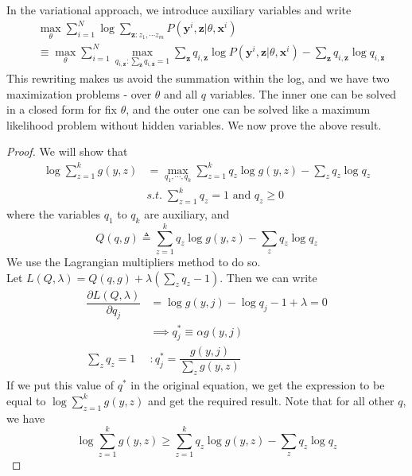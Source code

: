 In the variational approach, we introduce auxiliary variables and write
\begin{equation}
\begin{split}
&\max_\theta \sum_{i=1}^N \log \sum_{\mathbf z:z_1, \cdots z_m}P(\mathbf y^i, \mathbf z | \theta, \mathbf x^i) \\
&\equiv \max_\theta\sum_{i=1}^N \max_{q_{i,\mathbf z}:\sum_{\mathbf z} q_{i, \mathbf z} = 1} \sum_{\mathbf z} q_{i, \mathbf z} \log P(\mathbf y^i, \mathbf z | \theta, \mathbf x^i) - \sum_{\mathbf z} q_{i, \mathbf z} \log q_{i, \mathbf z}
\end{split}
\end{equation}
This rewriting makes us avoid the summation within the log, and we have two maximization problems - over $\theta$ and all $q$ variables. The inner one can be solved in a closed form for fix $\theta$, and the outer one can be solved like a maximum likelihood problem without hidden variables. We now prove the above result. \\
\begin{proof}
We will show that
\begin{equation}
\begin{split}
\log\sum_{z=1}^k g(y,z) &= \max_{q_1, \cdots, q_k} \sum_{z=1}^k q_z\log g(y,z) - \sum_z q_z\log q_z \\
&s.t. \; \sum_{z=1}^k q_z = 1 \text{ and } q_z \geq 0
\end{split}
\end{equation}
where the variables $q_1$ to $q_k$ are auxiliary, and
\begin{equation}
	Q(q, g) \triangleq \sum_{z=1}^k q_z \log g(y,z) - \sum_z q_z \log q_z
\end{equation}
We use the Lagrangian multipliers method to do so. \\
Let $L(Q,\lambda) = Q(q, g) + \lambda(\sum_z q_z - 1)$. Then we can write
\begin{align*}
\dfrac{\partial L(Q, \lambda)}{\partial q_j} &= \log g(y, j) - \log q_j - 1 + \lambda = 0 \\
&\implies q^*_j \equiv \alpha g(y,j) \\
\sum_z q_z = 1 &: q_j^* = \dfrac{g(y,j)}{\sum_z g(y,z)}
\end{align*}
If we put this value of $q^*$ in the original equation, we get the expression to be equal to $\log\sum_{z=1}^k g(y,z)$ and get the required result. Note that for all other $q$, we have
\[\log\sum_{z=1}^k g(y,z) \geq \sum_{z=1}^k q_z\log g(y,z) - \sum_z q_z\log q_z\]
\end{proof}